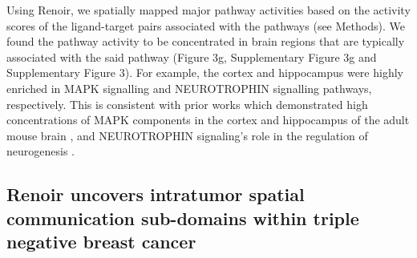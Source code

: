 
Using Renoir, we spatially mapped major pathway activities based on the activity scores of the ligand-target pairs associated with the pathways (see Methods). We found the pathway activity to be concentrated in brain regions that are typically associated with the said pathway (Figure 3g, Supplementary Figure 3g and Supplementary Figure 3). For example, the cortex and hippocampus were highly enriched in MAPK signalling and NEUROTROPHIN signalling pathways, respectively. This is consistent with prior works which demonstrated high concentrations of MAPK components in the cortex and hippocampus of the adult mouse brain \citep{https://doi.org/10.1002/cne.21186}, and NEUROTROPHIN signaling's role in the regulation of neurogenesis \citep{10.3389/fnins.2016.00026}. 

\subsection*{Renoir uncovers intratumor spatial communication sub-domains within triple negative breast cancer}

